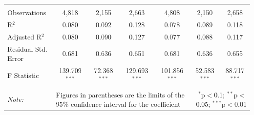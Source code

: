 \documentclass[alpha-refs]{wiley-article-01g}
\begin{document}
\begin{landscape}
\begin{table}[!htbp]
\begin{tabular}{@{\extracolsep{5pt}}lcccccc}
  & & & & & & \\ 
\hline \\[-3ex] 
Observations & 4,818 & 2,155 & 2,663 & 4,808 & 2,150 & 2,658 \\ 
R$^{2}$ & 0.080 & 0.092 & 0.128 & 0.078 & 0.089 & 0.118 \\ 
Adjusted R$^{2}$ & 0.080 & 0.090 & 0.127 & 0.077 & 0.088 & 0.117 \\ 
Residual Std. Error & 0.681 & 0.636 & 0.651 & 0.681 & 0.636 & 0.655 \\ 
F Statistic & 139.709$^{***}$ & 72.368$^{***}$ & 129.693$^{***}$ & 101.856$^{***}$ & 52.583$^{***}$ & 88.717$^{***}$ \\ 
\hline 
\hline \\[-3ex] 
\textit{Note:} &\multicolumn{4}{l}{Figures in parentheses are the limits of the 95\% confidence interval for the coefficient}  & \multicolumn{2}{r}{$^{*}$p$<$0.1; $^{**}$p$<$0.05; $^{***}$p$<$0.01} \\ 
\end{tabular} 
\end{table} 

\end{landscape}

\newpage
\end{document}
